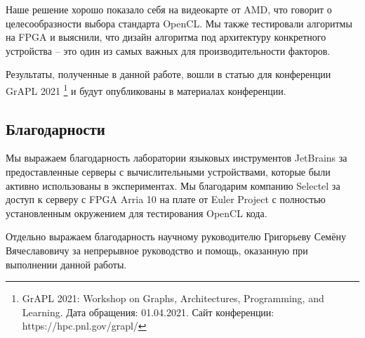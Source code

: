\documentclass[14pt]{extarticle}
\newcommand{\sectionbreak}{\clearpage}
\begin{document}
	Наше решение хорошо показало себя на видеокарте от AMD, что говорит о целесообразности выбора стандарта OpenCL. Мы также тестировали алгоритмы на FPGA и выяснили, что дизайн алгоритма под архитектуру конкретного устройства -- это один из самых важных для производительности факторов. 

	
	Результаты, полученные в данной работе, вошли в статью для конференции 	GrAPL 2021 \footnote{GrAPL 2021: Workshop on Graphs, Architectures, Programming, and Learning. Дата обращения: 01.04.2021. Сайт конференции: https://hpc.pnl.gov/grapl/} и будут опубликованы в материалах конференции.
	
	\subsection*{Благодарности}
	
	Мы выражаем благодарность лаборатории языковых инструментов JetBrains за предоставленные серверы с вычислительными устройствами, которые были активно использованы в экспериментах. Мы благодарим компанию Selectel за доступ к серверу с FPGA Arria 10 на плате от Euler Project с полностью установленным окружением для тестирования OpenCL кода. 
	
	Отдельно выражаем благодарность научному руководителю Григорьеву Семёну Вячеславовичу за непрерывное руководство и помощь, оказанную при выполнении данной работы.
	  

\sectionbreak

{}	

	
	
	
\end{document}
